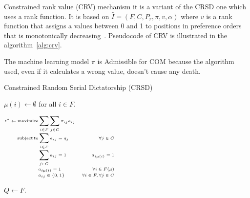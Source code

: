 Constrained rank value (CRV) mechanism it is a variant of the CRSD one which uses a rank function.
It is based on \(\hat {I} = ( F , C , P_r , \pi  ,v, \alpha )\) where \(v\) is a rank function that assigns a values between 0 and 1 to positions in preference orders that is monotonically decreasing~\cite{olbergml}.
Pseudocode of CRV is illustrated in the algorithm~\ref{alg:crv}.

The machine learning model \(\pi\) is Admissible for COM because the algorithm used, even if it calculates a wrong value, doesn’t cause any death.



\begin{algorithm}
    \caption{Constrained Random Serial Dictatorship (CRSD)}\label{alg:crsd}
    \KwResult{\(\mu\)}
    \( \mu ( i ) \leftarrow \emptyset \) for all \( i \in F \).

    \(\tiny
        \begin{aligned}
            z ^ * \leftarrow \operatorname{maximize} & \sum_{i \in F} \sum_{j \in C} \pi_{i j} a_{i j} \\[-1mm]
            \operatorname {subject}\operatorname{to} & \sum_{i \in F} a_{i j}=q_{j} & \forall j \in C \\[-1mm]
            & \sum_{j \in C} a_{i j}=1 & a_{i \mu(i)}=1 \\[-1mm]
            & a_{i\mu (i)} = 1 &  \forall i \in F(\mu) \\[-1mm]
            & a_{i j} \in\{0,1\} & \forall i \in F, \forall j \in C
        \end{aligned}
    \)%

    \( Q \leftarrow F \).

\end{algorithm}

